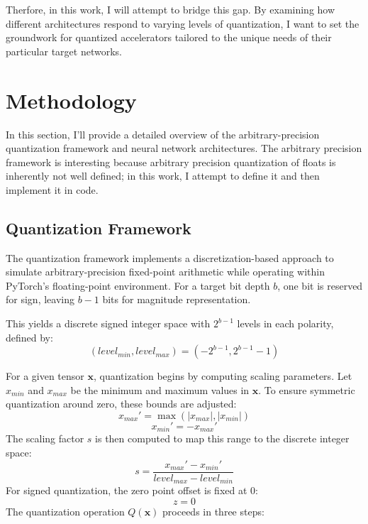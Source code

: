 \documentclass[twocolumn]{article}
\begin{document}
Therfore, in this work, I will attempt to bridge this gap. By examining how
different architectures respond to varying levels of quantization, I want to set
the groundwork for quantized accelerators tailored to the unique needs of their
particular target networks.

\section{Methodology}
In this section, I'll provide a detailed overview of the arbitrary-precision
quantization framework and neural network architectures. The arbitrary precision
framework is interesting because arbitrary precision quantization of floats is
inherently not well defined; in this work, I attempt to define it and then
implement it in code.

\subsection{Quantization Framework}
The quantization framework implements a discretization-based approach to
simulate arbitrary-precision fixed-point arithmetic while operating within
PyTorch's floating-point environment. For a target bit depth $b$, one bit is
reserved for sign, leaving $b-1$ bits for magnitude representation. 

This yields
a discrete signed integer space with $2^{b-1}$ levels in each polarity, defined
by:
\begin{equation*}
(level_{min}, level_{max}) = (-2^{b-1}, 2^{b-1} - 1)
\end{equation*}

For a given tensor $\mathbf{x}$, quantization begins by computing scaling
parameters. Let $x_{min}$ and $x_{max}$ be the minimum and maximum values in
$\mathbf{x}$. To ensure symmetric quantization around zero, these bounds are
adjusted:
\begin{equation*}
x_{max}' = \max(|x_{max}|, |x_{min}|)
\end{equation*}
\begin{equation*}
x_{min}' = -x_{max}'
\end{equation*}
The scaling factor $s$ is then computed to map this range to the discrete integer space:
\begin{equation*}
s = \frac{x_{max}' - x_{min}'}{level_{max} - level_{min}}
\end{equation*}
For signed quantization, the zero point offset is fixed at 0:
\begin{equation*}
z = 0
\end{equation*}
The quantization operation $Q(\mathbf{x})$ proceeds in three steps:
\end{document}
